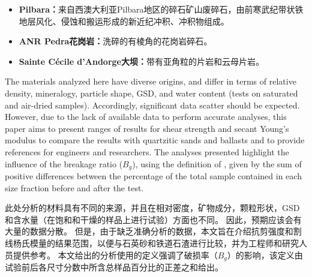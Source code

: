 \begin{ParaColumn}
    \switchcolumn

    \begin{itemize}
        \item \textbf{Pilbara：}来自西澳大利亚Pilbara地区的碎石矿山废碎石，由前寒武纪带状铁地层风化、侵蚀和搬运形成的新近纪冲积、冲积物组成。
        \item \textbf{ANR Pedra花岗岩：}洗碎的有棱角的花岗岩碎石。
        \item \textbf{Sainte Cécile d'Andorge大坝：}带有亚角粒的片岩和云母片岩。
    \end{itemize}

    \switchcolumn*

    The materials analyzed here have diverse origins, and differ in terms of relative density, mineralogy, particle shape, GSD, and water content (tests on saturated and air-dried samples). Accordingly, significant data scatter should be expected. However, due to the lack of available data to perform accurate analyses, this paper aims to present ranges of results for shear strength and secant Young’s modulus to compare the results with quartzitic sands and ballasts and to provide references for engineers and researchers. The analyses presented highlight the influence of the breakage ratio ($B_g$), using the definition of \citet{Marsal196727}, given by the sum of positive differences between the percentage of the total sample contained in each size fraction before and after the test.

    \switchcolumn

    此处分析的材料具有不同的来源，并且在相对密度，矿物成分，颗粒形状，GSD和含水量（在饱和和干燥的样品上进行试验）方面也不同。 因此，预期应该会有大量的数据分散。 但是，由于缺乏准确分析的数据，本文旨在介绍抗剪强度和割线杨氏模量的结果范围，以便与石英砂和铁道石渣进行比较，并为工程师和研究人员提供参考。 本文给出的分析使用\citet{Marsal196727}的定义强调了破损率（$B_g$）的影响，该定义由试验前后各尺寸分数中所含总样品百分比的正差之和给出。

\end{ParaColumn}